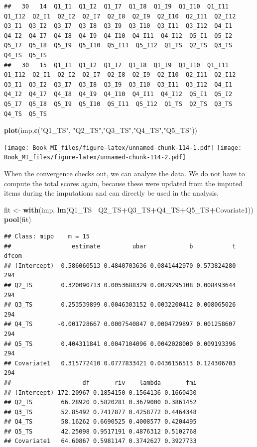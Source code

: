 \documentclass[]{book}
\newenvironment{Shaded}{\begin{snugshade}}{\end{snugshade}}
\newcommand{\KeywordTok}[1]{\textcolor[rgb]{0.13,0.29,0.53}{\textbf{#1}}}
\newcommand{\StringTok}[1]{\textcolor[rgb]{0.31,0.60,0.02}{#1}}
\newcommand{\OperatorTok}[1]{\textcolor[rgb]{0.81,0.36,0.00}{\textbf{#1}}}
\newcommand{\NormalTok}[1]{#1}
\begin{document}
\begin{verbatim}
##   30   14  Q1_I1  Q1_I2  Q1_I7  Q1_I8  Q1_I9  Q1_I10  Q1_I11  Q1_I12  Q2_I1  Q2_I2  Q2_I7  Q2_I8  Q2_I9  Q2_I10  Q2_I11  Q2_I12  Q3_I1  Q3_I2  Q3_I7  Q3_I8  Q3_I9  Q3_I10  Q3_I11  Q3_I12  Q4_I1  Q4_I2  Q4_I7  Q4_I8  Q4_I9  Q4_I10  Q4_I11  Q4_I12  Q5_I1  Q5_I2  Q5_I7  Q5_I8  Q5_I9  Q5_I10  Q5_I11  Q5_I12  Q1_TS  Q2_TS  Q3_TS  Q4_TS  Q5_TS
##   30   15  Q1_I1  Q1_I2  Q1_I7  Q1_I8  Q1_I9  Q1_I10  Q1_I11  Q1_I12  Q2_I1  Q2_I2  Q2_I7  Q2_I8  Q2_I9  Q2_I10  Q2_I11  Q2_I12  Q3_I1  Q3_I2  Q3_I7  Q3_I8  Q3_I9  Q3_I10  Q3_I11  Q3_I12  Q4_I1  Q4_I2  Q4_I7  Q4_I8  Q4_I9  Q4_I10  Q4_I11  Q4_I12  Q5_I1  Q5_I2  Q5_I7  Q5_I8  Q5_I9  Q5_I10  Q5_I11  Q5_I12  Q1_TS  Q2_TS  Q3_TS  Q4_TS  Q5_TS
\end{verbatim}

\begin{Shaded}
\begin{Highlighting}[]
\KeywordTok{plot}\NormalTok{(imp,}\KeywordTok{c}\NormalTok{(}\StringTok{"Q1_TS"}\NormalTok{, }\StringTok{"Q2_TS"}\NormalTok{,}\StringTok{"Q3_TS"}\NormalTok{,}\StringTok{"Q4_TS"}\NormalTok{,}\StringTok{"Q5_TS"}\NormalTok{))}
\end{Highlighting}
\end{Shaded}

\texttt{[image: Book\_MI\_files/figure-latex/unnamed-chunk-114-1.pdf]}
\texttt{[image: Book\_MI\_files/figure-latex/unnamed-chunk-114-2.pdf]}

When the convergence checks out, we can analyze the data. We do not have
to compute the total scores again, because these were updated from the
imputed items during the imputations and can directly be used in the
analysis.

\begin{Shaded}
\begin{Highlighting}[]
\NormalTok{fit <-}\StringTok{ }\KeywordTok{with}\NormalTok{(imp, }\KeywordTok{lm}\NormalTok{(Q1_TS}\OperatorTok{~}\StringTok{ }\NormalTok{Q2_TS}\OperatorTok{+}\NormalTok{Q3_TS}\OperatorTok{+}\NormalTok{Q4_TS}\OperatorTok{+}\NormalTok{Q5_TS}\OperatorTok{+}\NormalTok{Covariate1))}
\KeywordTok{pool}\NormalTok{(fit)}
\end{Highlighting}
\end{Shaded}

\begin{verbatim}
## Class: mipo    m = 15 
##                 estimate         ubar            b           t dfcom
## (Intercept)  0.586060513 0.4840703636 0.0841442970 0.573824280   294
## Q2_TS        0.320090713 0.0053688329 0.0029295108 0.008493644   294
## Q3_TS        0.253539899 0.0046303152 0.0032200412 0.008065026   294
## Q4_TS       -0.001728667 0.0007540847 0.0004729897 0.001258607   294
## Q5_TS        0.404311841 0.0047104096 0.0042028000 0.009193396   294
## Covariate1   0.315772410 0.0777833421 0.0436156513 0.124306703   294
##                    df       riv    lambda       fmi
## (Intercept) 172.20967 0.1854150 0.1564136 0.1660430
## Q2_TS        66.28920 0.5820281 0.3679000 0.3861452
## Q3_TS        52.85492 0.7417877 0.4258772 0.4464348
## Q4_TS        58.16262 0.6690525 0.4008577 0.4204495
## Q5_TS        42.25098 0.9517191 0.4876312 0.5102768
## Covariate1   64.60867 0.5981147 0.3742627 0.3927733
\end{verbatim}
\end{document}
